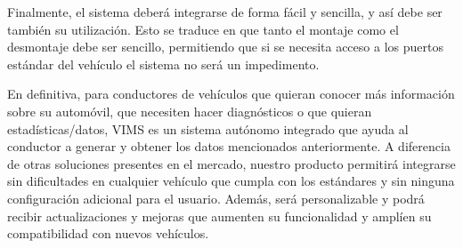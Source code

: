 Finalmente, el sistema deberá integrarse de forma fácil y sencilla, y así debe ser
también su utilización. Esto se traduce en que tanto el
montaje como el desmontaje debe ser sencillo, permitiendo que si se necesita acceso
a los puertos estándar del vehículo el sistema no será un impedimento.

En definitiva, para conductores de vehículos que quieran conocer
más información sobre su automóvil, que necesiten hacer diagnósticos o que quieran
estadísticas/datos, \ac{VIMS} es un sistema autónomo integrado
que ayuda al conductor a generar y obtener los datos mencionados anteriormente. 
A diferencia de otras soluciones presentes
en el mercado, nuestro producto permitirá integrarse sin dificultades en cualquier
vehículo que cumpla con los estándares y sin ninguna configuración adicional para
el usuario. Además, será personalizable y podrá recibir actualizaciones
y mejoras que aumenten su funcionalidad y amplíen su compatibilidad 
con nuevos vehículos.